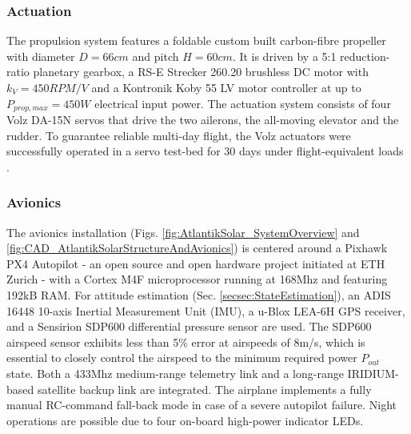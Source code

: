 \subsubsection{Actuation}
The propulsion system features a foldable custom built carbon-fibre propeller with diameter $D=66cm$ and pitch $H=60cm$. It is driven by a 5:1 reduction-ratio planetary gearbox, a RS-E Strecker 260.20 brushless DC motor with $k_V=450RPM/V$ and a Kontronik Koby 55 LV motor controller at up to $P_{prop,max}=450W$ electrical input power. The actuation system consists of four Volz DA-15N servos that drive the two ailerons, the all-moving elevator and the rudder. To guarantee reliable multi-day flight, the Volz actuators were successfully operated in a servo test-bed for 30 days under flight-equivalent loads \cite{DellaCa_BT}.

\subsubsection{Avionics}
The avionics installation (Figs. \ref{fig:AtlantikSolar_SystemOverview} and \ref{fig:CAD_AtlantikSolarStructureAndAvionics}) is centered around a Pixhawk PX4 Autopilot - an open source and open hardware project initiated at ETH Zurich - with a Cortex M4F microprocessor running at 168Mhz and featuring 192kB RAM. For attitude estimation (Sec. \ref{secsec:StateEstimation}), an ADIS 16448 10-axis Inertial Measurement Unit (IMU), a u-Blox LEA-6H GPS receiver, and a Sensirion SDP600 differential pressure sensor are used. The SDP600 airspeed sensor exhibits less than 5\% error at airspeeds of 8m/s, which is essential to closely control the airspeed to the minimum required power $P_{out}$ state. Both a 433Mhz medium-range telemetry link and a long-range IRIDIUM-based satellite backup link are integrated. The airplane implements a fully manual RC-command fall-back mode in case of a severe autopilot failure. Night operations are possible due to four on-board high-power indicator LEDs.

